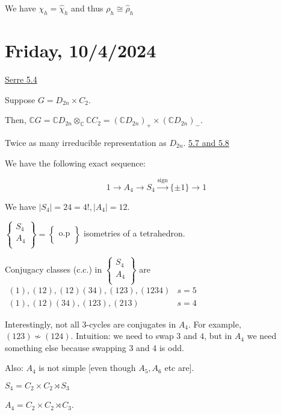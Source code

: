\documentclass{article}
\theoremstyle{definition}
\begin{document}
We have \(\chi_h = \hat{\chi}_h\) and thus \(\rho_h \cong \hat{\rho}_h\) 

\section*{Friday, 10/4/2024}

\underline{Serre 5.4}

Suppose \(G = D_{2n} \times C_2\).

Then, \(\mathbb{C} G = \mathbb{C} D_{2n} \otimes _\mathbb{C} \mathbb{C} C_2 = (\mathbb{C} D_{2n})_+ \times (\mathbb{C} D_{2n})_{-}\).

Twice as many irreducible representation as \(D_{2n}\).
\underline{5.7 and 5.8}

We have the following exact sequence:

\[
    1 \to A_4 \to S_4 \overset{\text{sign}}{\to} \{ \pm 1 \} \to 1
\]

We have \(\vert S_4 \vert = 24 = 4!, \vert A_4 \vert = 12\).

\(\left\{ \begin{matrix}
     S_4 \\
     A_4 \\
\end{matrix} \right\} = \left\{ \begin{matrix}
      \\
     \text{o.p}  \\
\end{matrix} \right\}  \) isometries of a tetrahedron.

Conjugacy classes (c.c.) in \(\left\{ \begin{matrix}
    S_4 \\
    A_4 \\
\end{matrix} \right\}\) are \(\begin{matrix}(1),(12),(12)(34),(123),(1234) & s=5\\ (1),(12)(34),(123),(213) & s=4\end{matrix}\) 

Interestingly, not all \(3\)-cycles are conjugates in \(A_4\). For example, \((123) \not\sim (124)\). Intuition: we need to swap \(3\) and \(4\), but in \(A_4\) we need something else because swapping \(3\) and \(4\) is odd.

Also: \(A_4\) is not simple [even though \(A_5,A_6\) etc are].

\(S_4 = C_2 \times C_2 \rtimes S_3\) 

\(A_4 = C_2 \times C_2 \rtimes C_3\).
\end{document}
